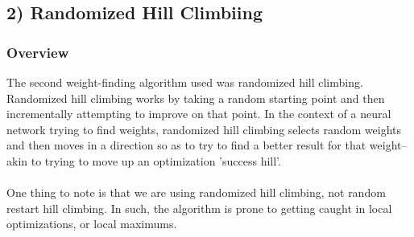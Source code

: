 \documentclass[h]{article}
\begin{document}
\subsection*{2) Randomized Hill Climbiing}  
\subsubsection*{Overview}
The second weight-finding algorithm used was randomized hill climbing.  
Randomized hill climbing works by taking a random starting point and then 
incrementally attempting to improve on that point.  In the context of a neural 
network trying to find weights,  randomized hill climbing selects random weights 
and then moves in a direction so as to try to find a better result for that 
weight--akin to trying to move up an optimization 'success hill'.
\\ \\ 
One thing to 
note is that we are using randomized hill climbing, not random restart hill 
climbing.  In such, the algorithm is prone to getting caught in local optimizations, or local maximums. 
\end{document}
